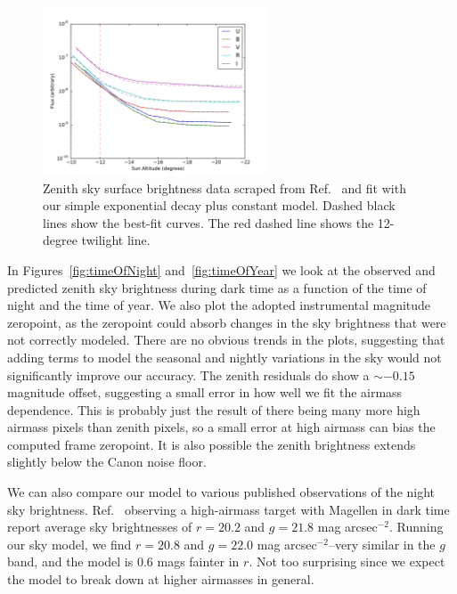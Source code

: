 \documentclass[]{spie}
\begin{document}
\begin{figure}[ht]
  \begin{center}
  \includegraphics[height=5cm]{plots/patatFits.pdf}
  \end{center}
  \caption{Zenith sky surface brightness data scraped from Ref.~ and fit with our simple exponential decay plus constant model. Dashed black lines show the best-fit curves.  The red dashed line shows the 12-degree twilight line.  \label{fig:Patat} }
\end{figure}


In Figures~\ref{fig:timeOfNight} and~\ref{fig:timeOfYear} we look at the observed and predicted zenith sky brightness during dark time as a function of the time of night and the time of year.  We also plot the adopted instrumental magnitude zeropoint, as the zeropoint could absorb changes in the sky brightness that were not correctly modeled.  There are no obvious trends in the plots, suggesting that adding terms to model the seasonal and nightly variations in the sky would not significantly improve our accuracy.  The zenith residuals do show a $\sim-0.15$ magnitude offset, suggesting a small error in how well we fit the airmass dependence.  This is probably just the result of there being many more high airmass pixels than zenith pixels, so a small error at high airmass can bias the computed frame zeropoint. It is also possible the zenith brightness extends slightly below the Canon noise floor.

We can also compare our model to various published observations of the night sky brightness.  Ref.~ observing a high-airmass target with Magellen in dark time report average sky brightnesses of $r=20.2$ and $g=21.8$ mag arcsec$^{-2}$.  Running our sky model, we find  $r=20.8$ and $g=22.0$ mag arcsec$^{-2}$--very similar in the $g$ band, and the model is 0.6 mags fainter in $r$.  Not too surprising since we expect the model to break down at higher airmasses in general.
\end{document}
